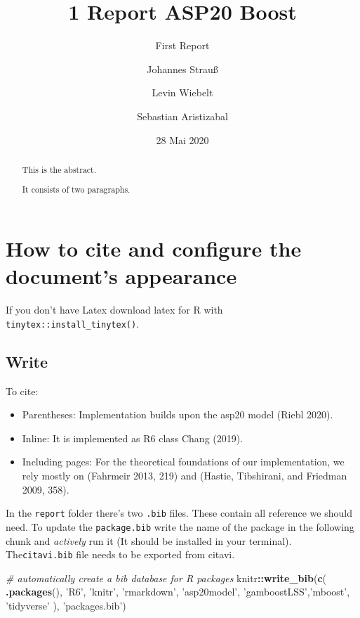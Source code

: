 \documentclass[
]{report}
\title{1 Report ASP20 Boost}
\subtitle{First Report}
\author{Johannes Strauß \and Levin Wiebelt \and Sebastian Aristizabal}
\date{28 Mai 2020}
\newenvironment{Shaded}{\begin{snugshade}}{\end{snugshade}}
\newcommand{\CommentTok}[1]{\textcolor[rgb]{0.56,0.35,0.01}{\textit{#1}}}
\newcommand{\KeywordTok}[1]{\textcolor[rgb]{0.13,0.29,0.53}{\textbf{#1}}}
\newcommand{\NormalTok}[1]{#1}
\newcommand{\OperatorTok}[1]{\textcolor[rgb]{0.81,0.36,0.00}{\textbf{#1}}}
\newcommand{\StringTok}[1]{\textcolor[rgb]{0.31,0.60,0.02}{#1}}
\providecommand{\tightlist}{%
  \setlength{\itemsep}{0pt}\setlength{\parskip}{0pt}}
\begin{document}
\maketitle
\begin{abstract}
This is the abstract.

It consists of two paragraphs.
\end{abstract}

{
\setcounter{tocdepth}{1}
\tableofcontents
}
\hypertarget{how-to-cite-and-configure-the-documents-appearance}{%
\chapter{How to cite and configure the document's
appearance}\label{how-to-cite-and-configure-the-documents-appearance}}

If you don't have Latex download latex for R with
\texttt{tinytex::install\_tinytex()}.

\hypertarget{write}{%
\section{Write}\label{write}}

To cite:

\begin{itemize}
\tightlist
\item
  Parentheses: Implementation builds upon the asp20 model (Riebl 2020).
\item
  Inline: It is implemented as R6 class Chang (2019).
\item
  Including pages: For the theoretical foundations of our
  implementation, we rely mostly on (Fahrmeir 2013, 219) and (Hastie,
  Tibshirani, and Friedman 2009, 358).
\end{itemize}

In the \texttt{report} folder there's two \texttt{.bib} files. These
contain all reference we should need. To update the \texttt{package.bib}
write the name of the package in the following chunk and \emph{actively}
run it (It should be installed in your terminal). The\texttt{citavi.bib}
file needs to be exported from citavi.

\begin{Shaded}
\begin{Highlighting}[]
\CommentTok{# automatically create a bib database for R packages}
\NormalTok{knitr}\OperatorTok{::}\KeywordTok{write_bib}\NormalTok{(}\KeywordTok{c}\NormalTok{(}
  \KeywordTok{.packages}\NormalTok{(), }\StringTok{'R6'}\NormalTok{, }\StringTok{'knitr'}\NormalTok{, }\StringTok{'rmarkdown'}\NormalTok{, }\StringTok{'asp20model'}\NormalTok{, }\StringTok{'gamboostLSS'}\NormalTok{,}\StringTok{'mboost'}\NormalTok{, }\StringTok{'tidyverse'}  
\NormalTok{), }\StringTok{'packages.bib'}\NormalTok{)}
\end{Highlighting}
\end{Shaded}
\end{document}
